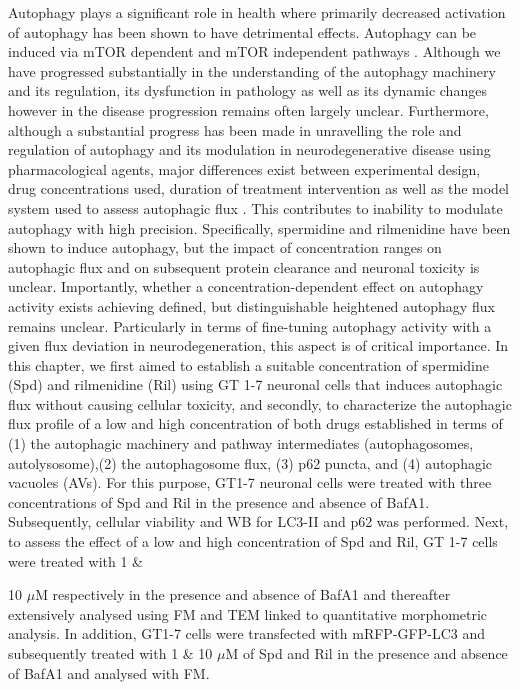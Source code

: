 Autophagy plays a significant role in health where primarily decreased activation of autophagy has been shown to have detrimental effects. Autophagy can be induced via mTOR dependent and mTOR independent pathways \citep{sarkar2013}. Although we have progressed substantially in the understanding of the autophagy machinery and its regulation, its dysfunction in pathology as well as its dynamic changes however in the disease progression remains often largely unclear. Furthermore, although a substantial progress has been made in unravelling the role and regulation of autophagy and its modulation in neurodegenerative disease using pharmacological agents, major differences exist between experimental design, drug concentrations used, duration of treatment intervention as well as the model system used to assess autophagic flux \citep{lumkwana2017}. This contributes to inability to modulate autophagy with high precision. Specifically, spermidine and rilmenidine have been shown to induce autophagy, but the impact of concentration ranges on autophagic flux and on subsequent protein clearance and neuronal toxicity is unclear. Importantly, whether a concentration-dependent effect on autophagy activity exists achieving defined, but distinguishable heightened autophagy flux remains unclear. Particularly in terms of fine-tuning autophagy activity with a given flux deviation in neurodegeneration, this aspect is of critical importance. In this chapter, we first aimed to establish a suitable concentration of spermidine (Spd) and rilmenidine (Ril) using GT 1-7 neuronal cells that induces autophagic flux without causing cellular toxicity, and secondly, to characterize the autophagic flux profile of a low and high concentration of both drugs established in terms of (1) the autophagic machinery and pathway intermediates (autophagosomes, autolysosome),(2) the autophagosome flux, (3) p62 puncta, and (4) autophagic vacuoles (AVs). For this purpose, GT1-7 neuronal cells were treated with three concentrations of Spd and Ril in the presence and absence of BafA1. Subsequently, cellular viability and WB for LC3-II and p62 was performed. Next, to assess the effect of a low and high concentration of Spd and Ril, GT 1-7 cells were treated with 1 \& {10 $\mu$M respectively in the presence and absence of BafA1 and thereafter extensively analysed using FM and TEM linked to quantitative morphometric analysis. In addition, GT1-7 cells were transfected with mRFP-GFP-LC3 \citep{yoshii2017} and subsequently treated with 1 \& 10 $\mu$M of Spd and Ril in the presence and absence of BafA1 and analysed with FM.
 
}

